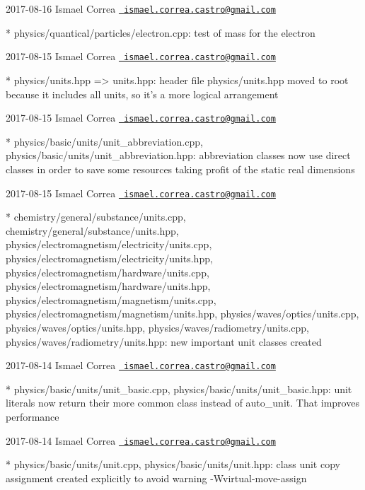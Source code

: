  2017-\/08-\/16 Ismael Correa \href{mailto:ismael.correa.castro@gmail.com}{\texttt{ ismael.\+correa.\+castro@gmail.\+com}} \begin{DoxyVerb}* physics/quantical/particles/electron.cpp: test of mass for the
electron
\end{DoxyVerb}
 2017-\/08-\/15 Ismael Correa \href{mailto:ismael.correa.castro@gmail.com}{\texttt{ ismael.\+correa.\+castro@gmail.\+com}} \begin{DoxyVerb}* physics/units.hpp => units.hpp: header file physics/units.hpp
moved to root because it includes all units, so it's a more logical
arrangement
\end{DoxyVerb}
 2017-\/08-\/15 Ismael Correa \href{mailto:ismael.correa.castro@gmail.com}{\texttt{ ismael.\+correa.\+castro@gmail.\+com}} \begin{DoxyVerb}* physics/basic/units/unit_abbreviation.cpp,
physics/basic/units/unit_abbreviation.hpp: abbreviation classes now
use direct classes in order to save some resources taking profit of
the static real dimensions
\end{DoxyVerb}
 2017-\/08-\/15 Ismael Correa \href{mailto:ismael.correa.castro@gmail.com}{\texttt{ ismael.\+correa.\+castro@gmail.\+com}} \begin{DoxyVerb}* chemistry/general/substance/units.cpp,
chemistry/general/substance/units.hpp,
physics/electromagnetism/electricity/units.cpp,
physics/electromagnetism/electricity/units.hpp,
physics/electromagnetism/hardware/units.cpp,
physics/electromagnetism/hardware/units.hpp,
physics/electromagnetism/magnetism/units.cpp,
physics/electromagnetism/magnetism/units.hpp,
physics/waves/optics/units.cpp, physics/waves/optics/units.hpp,
physics/waves/radiometry/units.cpp,
physics/waves/radiometry/units.hpp: new important unit classes
created
\end{DoxyVerb}
 2017-\/08-\/14 Ismael Correa \href{mailto:ismael.correa.castro@gmail.com}{\texttt{ ismael.\+correa.\+castro@gmail.\+com}} \begin{DoxyVerb}* physics/basic/units/unit_basic.cpp,
physics/basic/units/unit_basic.hpp: unit literals now return their
more common class instead of auto_unit. That improves performance
\end{DoxyVerb}
 2017-\/08-\/14 Ismael Correa \href{mailto:ismael.correa.castro@gmail.com}{\texttt{ ismael.\+correa.\+castro@gmail.\+com}} \begin{DoxyVerb}* physics/basic/units/unit.cpp, physics/basic/units/unit.hpp: class
unit copy assignment created explicitly to avoid warning
-Wvirtual-move-assign
\end{DoxyVerb}
